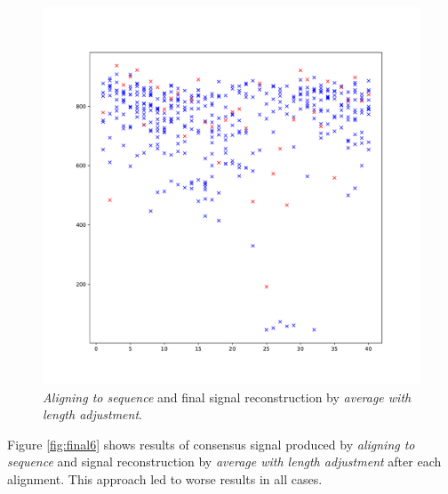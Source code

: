 \begin{figure}[h]
  \centering
  \includegraphics[width=1.0\textwidth]{images/final2}
  \caption{\textit{Aligning to sequence} and final signal reconstruction by \textit{average with length adjustment}.}
  \label{fig:final2}
\end{figure}


Figure \ref{fig:final6} shows results of consensus signal produced by \textit{aligning to sequence} and
signal reconstruction by \textit{average with length adjustment} after each alignment. This approach led to worse results
in all cases. 


